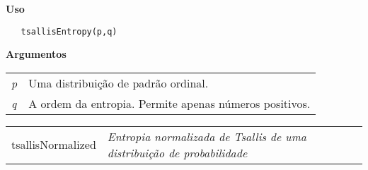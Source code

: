 \vspace{-0.5cm}

\hrulefill  

\vspace{0.5cm}

\textbf{Uso}

\begin{lstlisting}
   tsallisEntropy(p,q)
\end{lstlisting}

\vspace{0.5cm}

\textbf{Argumentos}

\begin{table}[!ht]
\begin{center}
\begin{tabularx}{\textwidth}{X X}
\hspace{0.5cm} \textit{p} \vspace{0.5cm}& Uma distribuição de padrão ordinal.\vspace{0.5cm}\\
\hspace{0.5cm} \textit{q} \vspace{0.5cm}& A ordem da entropia. Permite apenas números positivos.\vspace{0.5cm}\\
\end{tabularx}
\end{center}
\end{table} 

\newpage

\hrulefill   

\begin{table}[!ht]
\begin{center}
\begin{tabularx}{\textwidth}{ X X}
\hspace{0.5cm} tsallisNormalized & \textit{Entropia normalizada de Tsallis de uma distribuição de probabilidade}\\
\end{tabularx}
\end{center}
\end{table} 

\vspace{-0.5cm}

\hrulefill  

\vspace{0.5cm}

